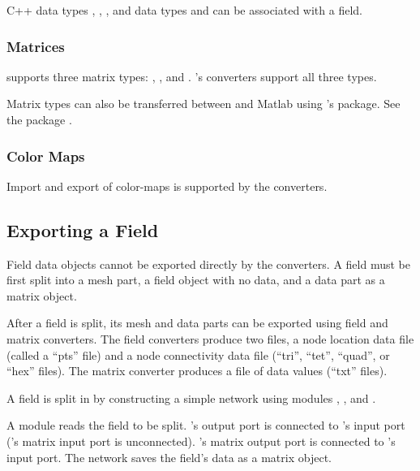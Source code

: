 C++ data types , , , and
\sr{} data types  and  can be
associated with a field.

\subsubsection{Matrices}

\sr{} supports three matrix types: ,
, and . \sr{}'s
converters support all three types.

Matrix types can also be transferred between \sr{} and Matlab using
\sr{}'s  package. See the
 package .


\subsubsection{Color Maps}

Import and export of color-maps is supported by the converters.

\subsection{Exporting a Field}
\label{sec:export_field}

Field data objects cannot be exported directly by the converters.  A
field must be first split into a mesh part, a field object with no data,
and a data part as a matrix object.

After a field is split, its mesh and data parts can be exported using
field and matrix converters.  The field converters produce two files,
a node location data file (called a ``pts'' file) and a node
connectivity data file (``tri'', ``tet'', ``quad'', or ``hex'' files).
The matrix converter produces a file of data values (``txt'' files).

A field is split in \sr{} by constructing a simple network using
modules , ,
and .  

A  module reads the field to be split.
's output port is connected to
's input port ('s
matrix input port is unconnected).  's
matrix output port is connected to 's input
port.  The network saves the field's data as a matrix object.

